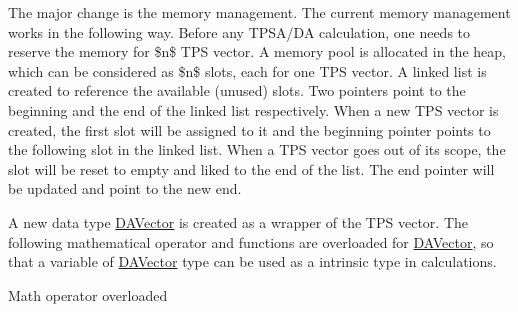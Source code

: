 The major change is the memory management. The current memory management works in the following way. Before any T\+P\+S\+A/\+DA calculation, one needs to reserve the memory for \$n\$ T\+PS vector. A memory pool is allocated in the heap, which can be considered as \$n\$ slots, each for one T\+PS vector. A linked list is created to reference the available (unused) slots. Two pointers point to the beginning and the end of the linked list respectively. When a new T\+PS vector is created, the first slot will be assigned to it and the beginning pointer points to the following slot in the linked list. When a T\+PS vector goes out of its scope, the slot will be reset to empty and liked to the end of the list. The end pointer will be updated and point to the new end.



A new data type \mbox{\hyperlink{struct_d_a_vector}{D\+A\+Vector}} is created as a wrapper of the T\+PS vector. The following mathematical operator and functions are overloaded for \mbox{\hyperlink{struct_d_a_vector}{D\+A\+Vector}}, so that a variable of \mbox{\hyperlink{struct_d_a_vector}{D\+A\+Vector}} type can be used as a intrinsic type in calculations.

Math operator overloaded

